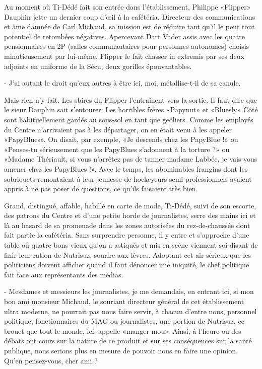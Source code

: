 Au moment où Ti-Dédé fait son entrée dans l’établissement, Philippe «Flipper» Dauphin jette un dernier coup d’œil à la cafétéria. Directeur des communications et âme damnée de Carl Michaud, sa mission est de réduire tant qu’il le peut tout potentiel de retombées négatives. Apercevant Dart Vader assis avec les quatre pensionnaires en 2P (salles communautaires pour personnes autonomes) choisis minutieusement par lui-même, Flipper le fait chasser in extremis par ses deux adjoints en uniforme de la Sécu, deux gorilles épouvantables.

- J’ai autant le droit qu’eux autres à être ici, moi, métallise-t-il de sa canule.

Mais rien n’y fait. Les sbires du Flipper l’entraînent vers la sortie. Il faut dire que le sieur Dauphin sait s’entourer. Les horribles frères «Papynut» et «Bluesly» Côté sont habituellement gardés au sous-sol en tant que geôliers. Comme les employés du Centre n’arrivaient pas à les départager, on en était venu à les appeler «PapyBlues». On disait, par exemple, «Je descends chez les PapyBlue !» ou «Penses-tu sérieusement que les PapyBlues s’adonnent à la torture ?» ou «Madame Thériault, si vous n’arrêtez pas de tanner madame Labbée, je vais vous amener chez les PapyBlues !». Avec le temps, les abominables frangins dont les sobriquets remontaient à leur jeunesse de hockeyeurs semi-professionnels avaient appris à ne pas poser de questions, ce qu’ils faisaient très bien.

Grand, distingué, affable, habillé en carte de mode, Ti-Dédé, suivi de son escorte, des patrons du Centre et d’une petite horde de journalistes, serre des mains ici et là au hasard de sa promenade dans les zones autorisées du rez-de-chaussée dont fait partie la cafétéria. Sans surprendre personne, il y entre et s’approche d’une table où quatre bons vieux qu’on a astiqués et mis en scène viennent soi-disant de finir leur ration de Nutrisuz, sourire aux lèvres. Adoptant cet air sérieux que les politiciens doivent afficher quand il faut dénoncer une iniquité, le chef politique fait face aux représentants des médias.

- Mesdames et messieurs les journalistes, je me demandais, en entrant ici, si mon bon ami monsieur Michaud, le souriant directeur général de cet établissement ultra moderne, ne pourrait pas nous faire servir, à chacun d’entre nous, personnel politique, fonctionnaires du MAG ou journalistes, une portion de Nutrisuz, ce brouet que tout le monde, ici, appelle «manger mou». Ainsi, à l’heure où des débats ont cours sur la nature de ce produit et sur ses conséquences sur la santé publique, nous serions plus en mesure de pouvoir nous en faire une opinion. Qu’en pensez-vous, cher ami ?

